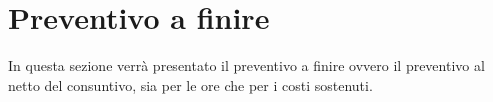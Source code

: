 \section{Preventivo a finire}

In questa sezione verrà presentato il preventivo a finire ovvero il preventivo al netto del consuntivo, sia per le ore che per i costi sostenuti.

\label{consuntivo}
